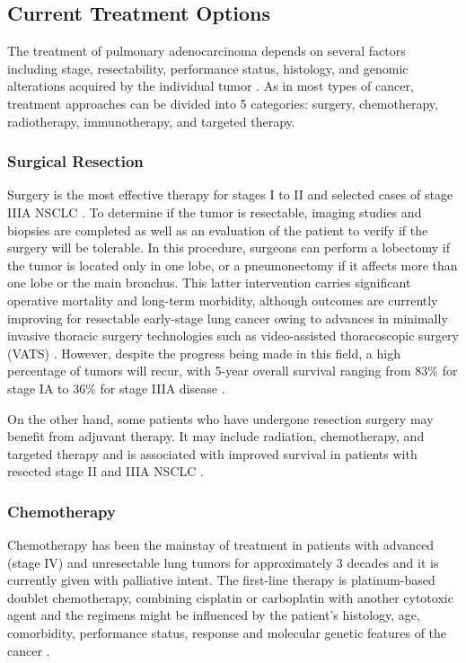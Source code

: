 \subsection{Current Treatment Options}

The treatment of pulmonary adenocarcinoma depends on several factors including stage, resectability, performance status, histology, and genomic alterations acquired by the individual tumor \cite{NSCLC}. As in most types of cancer, treatment approaches can be divided into 5 categories: surgery, chemotherapy, radiotherapy, immunotherapy, and targeted therapy.

\subsubsection{Surgical Resection}

Surgery is the most effective therapy for stages I to II and selected cases of stage IIIA NSCLC \cite{NSCLC_therapies}. To determine if the tumor is resectable, imaging studies and biopsies are completed as well as an evaluation of the patient to verify if the surgery will be tolerable. In this procedure, surgeons can perform a lobectomy if the tumor is located only in one lobe, or a pneumonectomy if it affects more than one lobe or the main bronchus. This latter intervention carries significant operative mortality and long-term morbidity, although outcomes are currently improving for resectable early-stage lung cancer owing to advances in minimally invasive thoracic surgery technologies such as video-assisted thoracoscopic surgery (VATS) \cite{VATS}. However, despite the progress being made in this field, a high percentage of tumors will recur, with 5-year overall survival ranging from 83\% for stage IA to 36\% for stage IIIA disease \cite{TNM_proposal}.

On the other hand, some patients who have undergone resection surgery may benefit from adjuvant therapy. It may include radiation, chemotherapy, and targeted therapy and is associated with improved survival in patients with resected stage II and IIIA NSCLC \cite{Adjuvant}.

\subsubsection{Chemotherapy}

Chemotherapy has been the mainstay of treatment in patients with advanced (stage IV) and unresectable lung tumors for approximately 3 decades and it is currently given with palliative intent. The first-line therapy is platinum-based doublet chemotherapy, combining cisplatin or carboplatin with another cytotoxic agent and the regimens might be influenced by the patient's histology, age, comorbidity, performance status,  response and molecular genetic features of the cancer \cite{NSCLC_therapies}.

